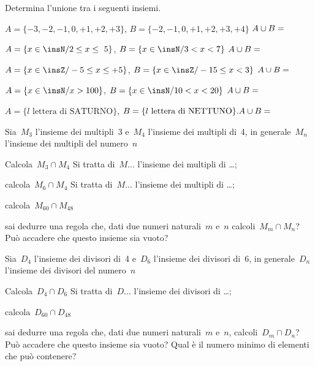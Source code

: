 \begin{esercizio}
\label{ese:7.45}
Determina l'unione tra i seguenti insiemi.

\begin{enumeratea}
 \item $A=\{-3,-2,-1,0,+1,+2,+3\}$, $B=\{-2,-1,0,+1,+2,+3,+4\}$ $A\cup 
B=\dotfill$
 \item $A=\{x\in\insN/2\le x\le~5\}$, $B=\{x\in\insN/3<x<7\}$ $A\cup B=\dotfill$
 \item $A=\{x\in\insZ/-5\le x\le +5\}$, $B=\{x\in\insZ/-15\le x<3\}$ $A\cup 
B=\dotfill$
 \item $A=\{x\in\insN/x>100\}$, $B=\{x\in \insN/10<x<20\}$ $A\cup B=\dotfill$
 \item $A=\{l\text{ lettera di SATURNO}\}$, $B=\{l\text{ lettera di NETTUNO}\}. 
A\cup B=\dotfill$
\end{enumeratea}
\end{esercizio}

\begin{esercizio}
\label{ese:7.46}
Sia~$M_{3}$ l'insieme dei multipli~3 e~$M_{4}$ l'insieme dei multipli di~4, in
generale~$M_{n}$ l'insieme dei multipli del numero~$n$
\vspace{-6pt}
 \begin{enumeratea}
 \item Calcola~$M_{3}\cap M_{4}$ Si tratta di~$M\ldots$ l'insieme dei multipli 
di \ldots;
 \item calcola~$M_{6}\cap M_{4}$ Si tratta di~$M\ldots$ l'insieme dei multipli 
di \ldots;
 \item calcola~$M_{60}\cap M_{48}$
 \item sai dedurre una regola che, dati due numeri naturali~$m$ e~$n$ 
calcoli~$M_{m}\cap M_{n}$? Può accadere che questo insieme sia vuoto?
 \end{enumeratea}
\end{esercizio}


\begin{esercizio}
\label{ese:7.47}
Sia~$D_{4}$ l'insieme dei divisori di~4 e~$D_{6}$ l'insieme dei divisori di~6, 
in generale~$D_{n}$ l'insieme dei divisori del numero~$n$
\vspace{-6pt}
\begin{enumeratea}
 \item Calcola~$D_{4}\cap D_{6}$ Si tratta di~$D\ldots$ l'insieme dei divisori 
di \ldots;
 \item calcola~$D_{60}\cap D_{48}$
 \item sai dedurre una regola che, dati due numeri naturali~$m$ e~$n$,
calcoli~$D_{m}\cap D_{n}$? Può accadere che questo insieme sia
vuoto? Qual è il numero minimo di elementi che può contenere?
\end{enumeratea}
\end{esercizio}

